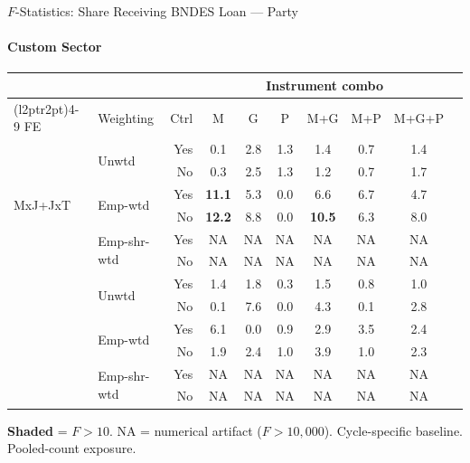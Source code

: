 \documentclass[aspectratio=169,10pt]{beamer}
\newcommand{\fpass}[1]{\cellcolor{pass}\textbf{#1}}
\begin{document}
\begin{frame}[t]{$F$-Statistics: Share Receiving BNDES Loan --- Party}
\framesubtitle{Custom Sector}
\begin{center}
\footnotesize
\setlength{\tabcolsep}{3.5pt}
\renewcommand{\arraystretch}{1.05}
\begin{tabular}{@{}llrccccccc@{}}
\toprule
 & & & \multicolumn{6}{c}{Instrument combo} \\
\cmidrule(l{2pt}r{2pt}){4-9}
FE & Weighting & Ctrl & M & G & P & M+G & M+P & M+G+P \\
\midrule
  \multirow{6}{*}{MxJ+JxT} & \multirow{2}{*}{Unwtd} & Yes & 0.1 & 2.8 & 1.3 & 1.4 & 0.7 & 1.4 \\
   &  & No & 0.3 & 2.5 & 1.3 & 1.2 & 0.7 & 1.7 \\
   & \multirow{2}{*}{Emp-wtd} & Yes & \fpass{11.1} & 5.3 & 0.0 & 6.6 & 6.7 & 4.7 \\
   &  & No & \fpass{12.2} & 8.8 & 0.0 & \fpass{10.5} & 6.3 & 8.0 \\
   & \multirow{2}{*}{Emp-shr-wtd} & Yes & NA & NA & NA & NA & NA & NA \\
   &  & No & NA & NA & NA & NA & NA & NA \\
\addlinespace[5pt]
  \multirow{6}{*}{MxJ+MxT} & \multirow{2}{*}{Unwtd} & Yes & 1.4 & 1.8 & 0.3 & 1.5 & 0.8 & 1.0 \\
   &  & No & 0.1 & 7.6 & 0.0 & 4.3 & 0.1 & 2.8 \\
   & \multirow{2}{*}{Emp-wtd} & Yes & 6.1 & 0.0 & 0.9 & 2.9 & 3.5 & 2.4 \\
   &  & No & 1.9 & 2.4 & 1.0 & 3.9 & 1.0 & 2.3 \\
   & \multirow{2}{*}{Emp-shr-wtd} & Yes & NA & NA & NA & NA & NA & NA \\
   &  & No & NA & NA & NA & NA & NA & NA \\
\bottomrule
\end{tabular}
\end{center}
{\scriptsize \colorbox{pass}{\textbf{Shaded}} = $F>10$. NA = numerical artifact ($F>10{,}000$). Cycle-specific baseline. Pooled-count exposure.}
\end{frame}
\end{document}
